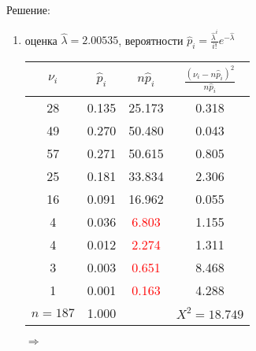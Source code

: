 \documentclass[a4paper,12pt]{article}
\newif\ifsolutions
\begin{document}
\ifsolutions Решение: \par
    \begin{enumerate}
        \item оценка $\widehat{\lambda} = 2.00535$, вероятности $\widehat{p}_i = \frac{\widehat{\lambda}^i}{i!} e^{- \widehat{\lambda}}$

              \begin{tabular}{|c|c|c|c|}
                  \hline
                  $\nu_i$   & $\widehat{p}_i$ & $n \widehat{p}_i$      & $\frac{(\nu_i - n \widehat{p}_i)^2}{n \widehat{p}_i}$ \\
                  \hline
                  28        & 0.135           & 25.173                 & 0.318                                                 \\
                  49        & 0.270           & 50.480                 & 0.043                                                 \\
                  57        & 0.271           & 50.615                 & 0.805                                                 \\
                  25        & 0.181           & 33.834                 & 2.306                                                 \\
                  16        & 0.091           & 16.962                 & 0.055                                                 \\
                  4         & 0.036           & \textcolor{red}{6.803} & 1.155                                                 \\
                  4         & 0.012           & \textcolor{red}{2.274} & 1.311                                                 \\
                  3         & 0.003           & \textcolor{red}{0.651} & 8.468                                                 \\
                  1         & 0.001           & \textcolor{red}{0.163} & 4.288                                                 \\
                  \hline
                  $n = 187$ & 1.000           &                        & $X^2 = 18.749$                                        \\
                  \hline
              \end{tabular}
              $\Rightarrow$
              \begin{tabular}{|c|c|c|c|c|}
                  \hline

\end{tabular}
\end{enumerate}
\end{document}
